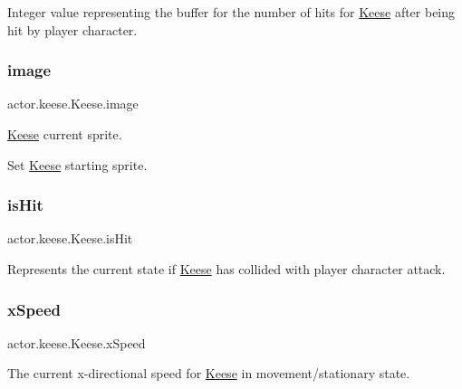 Integer value representing the buffer for the number of hits for \hyperlink{classactor_1_1keese_1_1_keese}{Keese} after being hit by player character. 

\mbox{\label{classactor_1_1keese_1_1_keese_ae61225fd17e93f8441dae1eef5e41538}} 
\subsubsection{\texorpdfstring{image}{image}}
{\footnotesize\ttfamily actor.\+keese.\+Keese.\+image}



\hyperlink{classactor_1_1keese_1_1_keese}{Keese} current sprite. 

Set \hyperlink{classactor_1_1keese_1_1_keese}{Keese} starting sprite. \mbox{\label{classactor_1_1keese_1_1_keese_a88d77dbe81f2a8ab5e25bfb8bb1b2ae7}} 
\subsubsection{\texorpdfstring{is\+Hit}{isHit}}
{\footnotesize\ttfamily actor.\+keese.\+Keese.\+is\+Hit}



Represents the current state if \hyperlink{classactor_1_1keese_1_1_keese}{Keese} has collided with player character attack. 

\mbox{\label{classactor_1_1keese_1_1_keese_a4d93a0d3f92f4e23517b90e538d40467}} 
\subsubsection{\texorpdfstring{x\+Speed}{xSpeed}}
{\footnotesize\ttfamily actor.\+keese.\+Keese.\+x\+Speed}



The current x-\/directional speed for \hyperlink{classactor_1_1keese_1_1_keese}{Keese} in movement/stationary state. 

